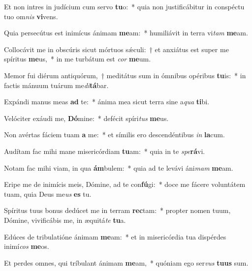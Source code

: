 \item Et non intres in judícium cum servo \textbf{tu}o:~* quia non justificábitur in conspéctu tuo om\textit{nis} \textbf{vi}vens.
\item Quia persecútus est inimícus ánimam \textbf{me}am:~* humiliávit in terra vi\textit{tam} \textbf{me}am.
\item Collocávit me in obscúris sicut mórtuos sǽculi:~† et anxiátus est super me spíritus \textbf{me}us,~* in me turbátum est \textit{cor} \textbf{me}um.
\item Memor fui diérum antiquórum,~† meditátus sum in ómnibus opéribus \textbf{tu}is:~* in factis mánuum tuárum me\textit{di}\textbf{tá}bar.
\item Expándi manus meas \textbf{ad} te:~* ánima mea sicut terra sine a\textit{qua} \textbf{ti}bi.
\item Velóciter exáudi me, \textbf{Dó}mine:~* defécit spíri\textit{tus} \textbf{me}us.
\item Non avértas fáciem tuam \textbf{a} me:~* et símilis ero descendéntibus \textit{in} \textbf{la}cum.
\item Audítam fac mihi mane misericórdiam \textbf{tu}am:~* quia in te \textit{spe}\textbf{rá}vi.
\item Notam fac mihi viam, in qua \textbf{ám}bulem:~* quia ad te levávi áni\textit{mam} \textbf{me}am.
\item Eripe me de inimícis meis, Dómine, ad te con\textbf{fú}gi:~* doce me fácere voluntátem tuam, quia Deus me\textit{us} \textbf{es} tu.
\item Spíritus tuus bonus dedúcet me in terram \textbf{rec}tam:~* propter nomen tuum, Dómine, vivificábis me, in æquitá\textit{te} \textbf{tu}a.
\item Edúces de tribulatióne ánimam \textbf{me}am:~* et in misericórdia tua dispérdes inimí\textit{cos} \textbf{me}os.
\item Et perdes omnes, qui tríbulant ánimam \textbf{me}am,~* quóniam ego ser\textit{vus} \textbf{tu}\textbf{us} sum.
